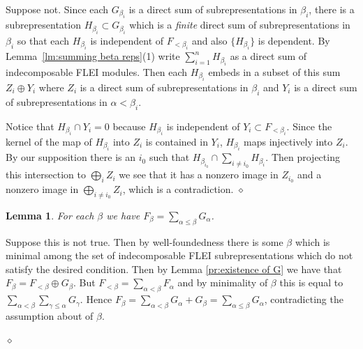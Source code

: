 \documentclass{article}
\newtheorem{lemma}{Lemma}[section]
\newenvironment{proof}{\vspace*{2ex}\noindent {\em Proof:}
}{\hfill $\diamond$ \\[2ex]}
\begin{document}
\begin{proof}
  Suppose not. Since each $G_{\beta_i}$ is a direct sum of subrepresentations in $\beta_i$, there is a subrepresentation $H_{\beta_i} \subset G_{\beta_i}$ which is a \emph{finite} direct sum of subrepresentations in $\beta_i$ so that each  $H_{\beta_i}$ is independent of $F_{< \beta_i}$ and also $\{ H_{\beta_i}\}$ is dependent.  By Lemma~\ref{lm:summing beta reps}(1) write $\sum_{i=1}^n H_{\beta_i}$  as a direct sum of indecomposable FLEI modules. Then each $H_{\beta_i}$ embeds in a subset of this sum $Z_i \oplus Y_i$ where $Z_i$ is a direct sum of subrepresentations in $\beta_i$ and $Y_i$ is a direct sum of subrepresentations in $\alpha < \beta_i$. 
  
   
Notice that $H_{\beta_i} \cap Y_i = 0$ because $H_{\beta_i}$ is independent of $Y_i \subset F_{<\beta_i}$.  Since the kernel of the map
 of $H_{\beta_i}$ into $Z_i$ is contained in $Y_i$, $H_{\beta_i}$ maps injectively  into $Z_i$.  By our supposition there is an $i_0$ such that $H_{\beta_{i_0}} \cap \sum_{i \neq i_0} H_{\beta_{i}}$.  Then projecting this intersection to $\bigoplus_i Z_i$ we see that it has a nonzero image in $Z_{i_0}$ and a nonzero image in $\bigoplus_{i \neq i_0} Z_i$, which is a contradiction.
\end{proof}

\begin{lemma} \label{lm:F is made of G}
For each $\beta$ we have $F_\beta = \sum_{\alpha \leq \beta} G_\alpha$.
\end{lemma}

\begin{proof}
Suppose this is not true. Then by well-foundedness there is some $\beta$ which is minimal among the set of indecomposable FLEI subrepresentations which do not satisfy the desired condition. Then by Lemma \ref{pr:existence of G} we have that $F_\beta = F_{<\beta} \oplus G_\beta$. But $F_{< \beta} = \sum_{\alpha < \beta} F_\alpha$ and by minimality of $\beta$ this is equal to $\sum_{\alpha < \beta} \sum_{\gamma \leq \alpha} G_\gamma$. Hence $F_\beta = \sum_{\alpha < \beta} G_\alpha + G_\beta = \sum_{\alpha \leq \beta} G_\alpha$, contradicting the assumption about of $\beta$.   


\end{proof}
\end{document}
